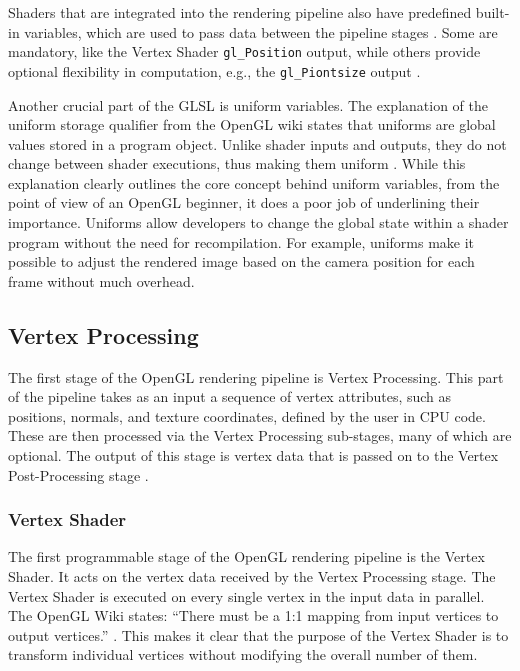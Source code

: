 \documentclass[
  digital,     %
  oneside,     %
  nosansbold,  %
  nocolorbold, %
  lof,         %
  lot,         %
]{fithesis4}
\begin{document}
Shaders that are integrated into the rendering pipeline also have predefined built-in variables, which
are used to pass data between the pipeline stages \cite{learnopengl-triangle}. Some are mandatory, like the Vertex Shader
\verb|gl_Position| output, while others provide optional flexibility in computation, e.g., the
\verb|gl_Piontsize| output \cite{openglwiki-vertex-shader}.

Another crucial part of the GLSL is uniform variables. The explanation of the uniform storage qualifier
from the OpenGL wiki states that uniforms are global values stored in a program object. Unlike
shader inputs and outputs, they do not change between shader executions, thus making them
uniform \cite{openglwiki-uniform}. While this explanation clearly outlines the core concept behind uniform variables, from
the point of view of an OpenGL beginner, it does a poor job of underlining their importance.
Uniforms allow developers to change the global state within a shader program without the need for
recompilation. For example, uniforms make it possible to adjust the rendered image based on the
camera position for each frame without much overhead.

\subsection{Vertex Processing}
The first stage of the OpenGL rendering pipeline is Vertex Processing. This part of the pipeline takes
as an input a sequence of vertex attributes, such as positions, normals, and texture coordinates,
defined by the user in CPU code. These are then processed via the Vertex Processing sub-stages,
many of which are optional. The output of this stage is vertex data that is passed
on to the Vertex Post-Processing stage \cite{openglwiki-vertex-processing}.

\subsubsection{Vertex Shader}
The first programmable stage of the OpenGL rendering pipeline is the Vertex Shader. It acts on
the vertex data received by the Vertex Processing stage. The Vertex Shader is executed on every
single vertex in the input data in parallel. The OpenGL Wiki states: \enquote{There must be a 1:1 mapping from
input vertices to output vertices.} \cite{openglwiki-vertex-shader}.
This makes it clear that the purpose of the Vertex Shader is to
transform individual vertices without modifying the overall number of them.
\end{document}
